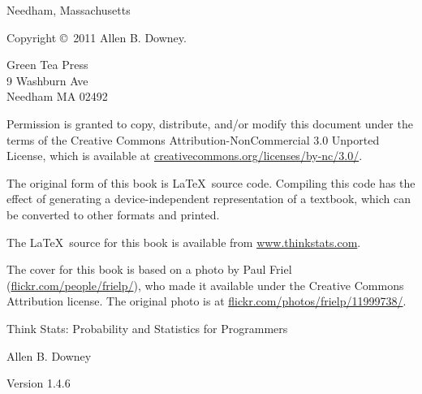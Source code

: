 \documentclass[12pt]{book}
\newcommand{\thetitle}{Think Stats: Probability and Statistics for Programmers}
\newcommand{\theversion}{1.4.6}
\begin{document}
\begin{latexonly}
\begin{flushright}
{\small Needham, Massachusetts}

\vfill

\end{flushright}


\pagebreak
\thispagestyle{empty}

{\small
Copyright \copyright ~2011 Allen B. Downey.


\vspace{0.2in}

\begin{flushleft}
Green Tea Press       \\
9 Washburn Ave \\
Needham MA 02492
\end{flushleft}

Permission is granted to copy, distribute, and/or modify this document
under the terms of the Creative Commons Attribution-NonCommercial 3.0 Unported
License, which is available at \url{creativecommons.org/licenses/by-nc/3.0/}.

The original form of this book is \LaTeX\ source code.  Compiling this
code has the effect of generating a device-independent representation
of a textbook, which can be converted to other formats and printed.

The \LaTeX\ source for this book is available from
\url{www.thinkstats.com}.

The cover for this book is based on a photo by Paul Friel
(\url{flickr.com/people/frielp/}), who made it available under
the Creative Commons Attribution license.  The original photo
is at \url{flickr.com/photos/frielp/11999738/}.

\vspace{0.2in}

} %

\end{latexonly}



\begin{htmlonly}


{\Large \thetitle}

{\large Allen B. Downey}

Version \theversion

\setcounter{chapter}{-1}

\end{htmlonly}
\end{document}
